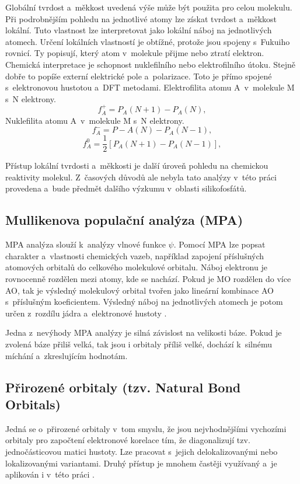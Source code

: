 \documentclass[
digital, %
table,   %
lof,     %
lot,     %
oneside,
]{fithesis3}
\begin{document}
Globální tvrdost a~měkkost uvedená výše může být použita pro celou molekulu. Při podrobnějším pohledu na jednotlivé atomy lze získat tvrdost a~měkkost lokální. Tuto vlastnost lze interpretovat jako lokální náboj na jednotlivých atomech. Určení lokálních vlastností je obtížné, protože jsou spojeny s~Fukuiho rovnicí. Ty popisují, který atom v~molekule přijme nebo ztratí elektron. Chemická interpretace je schopnost nuklefilního nebo elektrofilního útoku. Stejně dobře to popíše externí elektrické pole a~polarizace. Toto je přímo spojené s~elektronovou hustotou a~DFT metodami. Elektrofilita atomu A~v~molekule M s~N elektrony.
\begin{equation}
f_A^+ = P_A(N+1) - P_A(N),
\end{equation}
Nuklefilita atomu A~v~molekule M s~N elektrony.
\begin{equation}
f_A^- = P-A(N) - P_A(N-1),
\end{equation}
\begin{equation}
f_A^0 = \frac{1}{2}[P_A(N+1) - P_A(N-1)],
\end{equation}

Přístup lokální tvrdosti a~měkkosti je další úroveň pohledu na chemickou reaktivity molekul. Z~časových důvodů ale nebyla tato analýzy v~této práci provedena a~bude předmět dalšího výzkumu v~oblasti silikofosfátů.

\subsection{Mullikenova populační analýza (MPA)}
MPA analýza slouží k~analýzy vlnové funkce $\psi$. Pomocí MPA lze popsat charakter a~vlastnosti chemických vazeb, například zapojení příslušných atomových orbitalů do celkového molekulové orbitalu. Náboj elektronu je rovnocenně rozdělen mezi atomy, kde se nachází. Pokud je MO rozdělen do více AO, tak je výsledný molekulový orbital tvořen jako lineární kombinace AO s~příslušným koeficientem. Výsledný náboj na jednotlivých atomech je potom určen z~rozdílu jádra a~elektronové hustoty \cite{lowe2011quantum}.


Jedna z~nevýhody MPA analýzy je silná závislost na velikosti báze. Pokud je zvolená báze přiliš velká, tak jsou i orbitaly příliš velké, dochází k~silnému míchání a~zkreslujícím hodnotám.

\subsection{Přirozené orbitaly (tzv. Natural Bond Orbitals)}
Jedná se o~přirozené orbitaly v~tom smyslu, že jsou nejvhodnějšími vychozími orbitaly pro započtení elektronové korelace tím, že diagonalizují tzv. jednočásticovou matici hustoty. Lze pracovat s~jejich delokalizovanými nebo lokalizovanými variantami. Druhý přístup je mnohem častěji využívaný a~je aplikován i v~této práci \cite{weinhold2005valency}.
\end{document}
